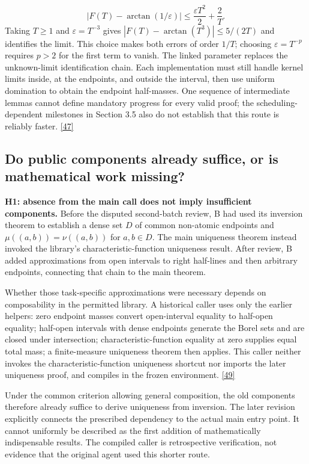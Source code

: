 \[
|F(T)-\arctan(1/\varepsilon)|\leq\frac{\varepsilon T^2}{2}+\frac2T.
\]
Taking $T\ge1$ and $\varepsilon=T^{-3}$ gives $|F(T)-\arctan(T^3)|\le5/(2T)$ and identifies the limit. This choice makes both errors of order $1/T$; choosing $\varepsilon=T^{-p}$ requires $p>2$ for the first term to vanish. The linked parameter replaces the unknown-limit identification chain. Each implementation must still handle kernel limits inside, at the endpoints, and outside the interval, then use uniform domination to obtain the endpoint half-masses. One sequence of intermediate lemmas cannot define mandatory progress for every valid proof; the scheduling-dependent milestones in Section 3.5 also do not establish that this route is reliably faster. \hyperlink{ref-47}{\mbox{[47]}}

\subsection[Do public components already suffice, or is mathematical work missing?]{\texorpdfstring{\protect\hypertarget{section-4-4}{}Do public components already suffice, or is mathematical work missing?}{Do public components already suffice, or is mathematical work missing?}}
\textbf{H1: absence from the main call does not imply insufficient components.} Before the disputed second-batch review, B had used its inversion theorem to establish a dense set $D$ of common non-atomic endpoints and $\mu((a,b))=\nu((a,b))$ for $a,b\in D$. The main uniqueness theorem instead invoked the library's characteristic-function uniqueness result. After review, B added approximations from open intervals to right half-lines and then arbitrary endpoints, connecting that chain to the main theorem.

Whether those task-specific approximations were necessary depends on composability in the permitted library. A historical caller uses only the earlier helpers: zero endpoint masses convert open-interval equality to half-open equality; half-open intervals with dense endpoints generate the Borel sets and are closed under intersection; characteristic-function equality at zero supplies equal total mass; a finite-measure uniqueness theorem then applies. This caller neither invokes the characteristic-function uniqueness shortcut nor imports the later uniqueness proof, and compiles in the frozen environment. \hyperlink{ref-49}{\mbox{[49]}}

Under the common criterion allowing general composition, the old components therefore already suffice to derive uniqueness from inversion. The later revision explicitly connects the prescribed dependency to the actual main entry point. It cannot uniformly be described as the first addition of mathematically indispensable results. The compiled caller is retrospective verification, not evidence that the original agent used this shorter route.

